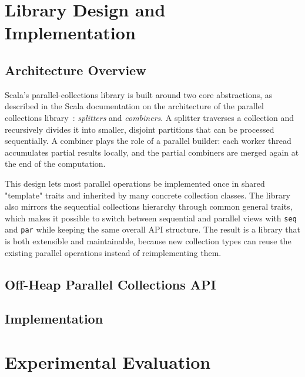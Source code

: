 \documentclass[
  english,   %
  bibtex,    %
]{kththesis}
\begin{document}
\chapter{Library Design and Implementation}
\label{ch:design}

\section{Architecture Overview}

Scala's parallel-collections library is built around two core abstractions,
as described in the Scala documentation on the architecture of the parallel
collections library~\cite{prokopec_parallel_2011}:
\textit{splitters} and \textit{combiners}.  A splitter traverses a collection
and recursively divides it into smaller, disjoint partitions that can be
processed sequentially.  A combiner plays the role of a parallel builder: each
worker thread accumulates partial results locally, and the partial combiners
are merged again at the end of the computation.

This design lets most parallel operations be implemented once in shared
"template" traits and inherited by many concrete collection classes.  The
library also mirrors the sequential collections hierarchy through common
general traits, which makes it possible to switch between sequential and
parallel views with \texttt{seq} and \texttt{par} while keeping the same
overall API structure.  The result is a library that is both extensible and
maintainable, because new collection types can reuse the existing parallel
operations instead of reimplementing them.

\section{Off-Heap Parallel Collections API}


\section{Implementation}


\chapter{Experimental Evaluation}
\label{ch:evaluation}
\end{document}
